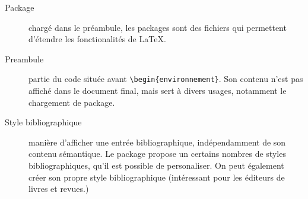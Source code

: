 \begin{description}
\item[Package]chargé dans le préambule, les packages sont des fichiers qui permettent d'étendre les fonctionalités  de \LaTeX.

\item[Preambule]partie du code  située avant \verb|\begin{environnement}|. Son contenu n'est pas affiché dans le document final, mais sert à divers usages, notamment le chargement de package.

\item[Style bibliographique]manière d'afficher une entrée bibliographique, indépendamment de son contenu sémantique. Le package  propose un certains nombres de styles bibliographiques, qu'il est possible de personaliser. On peut également créer son propre style bibliographique (intéressant pour les éditeurs de livres et revues.)
\end{description}